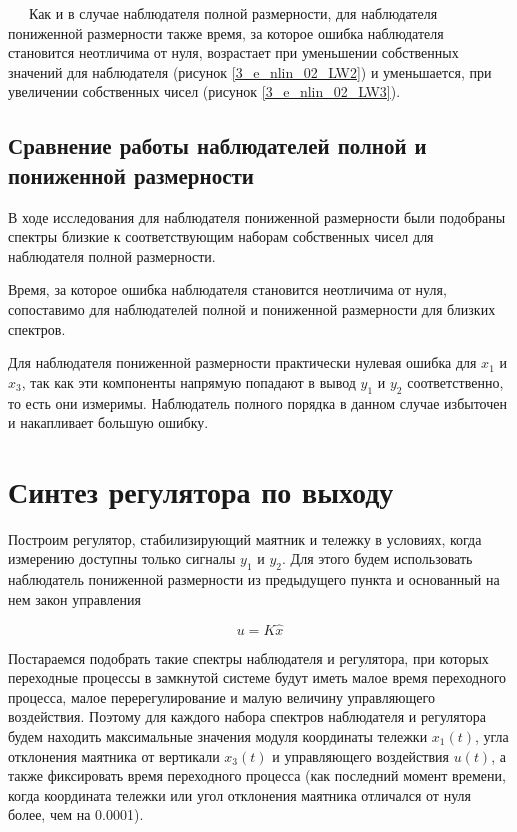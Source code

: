 \newpage
\,
\newpage
\,
\newpage
\,
\newpage
Как и в случае наблюдателя полной размерности, для наблюдателя пониженной размерности также время, за которое ошибка наблюдателя становится неотличима от нуля, возрастает при уменьшении собственных значений для наблюдателя (рисунок \ref{3_e_nlin_02_LW2}) и уменьшается, при увеличении собственных чисел (рисунок \ref{3_e_nlin_02_LW3}).

\subsection{Сравнение работы наблюдателей полной и пониженной размерности}

В ходе исследования для наблюдателя пониженной размерности были подобраны спектры близкие к соответствующим наборам собственных чисел для наблюдателя полной размерности. 

Время, за которое ошибка наблюдателя становится неотличима от нуля, сопоставимо для наблюдателей полной и пониженной размерности для близких спектров. 

Для наблюдателя пониженной размерности практически нулевая ошибка для $x_1$ и $x_3$, так как эти компоненты напрямую попадают в вывод $y_1$ и $y_2$ соответственно, то есть они измеримы. Наблюдатель полного порядка в данном случае избыточен и накапливает большую ошибку. 


\section{Синтез регулятора по выходу}
Построим регулятор, стабилизирующий маятник и тележку в условиях, когда измерению доступны только сигналы $y_1$ и $y_2$. Для этого будем использовать наблюдатель пониженной размерности из предыдущего пункта и основанный на нем закон управления

\begin{equation}
    u = K \hat{x}
\end{equation}

Постараемся подобрать такие спектры наблюдателя и регулятора, при которых переходные процессы в замкнутой системе будут иметь малое время переходного процесса, малое перерегулирование и малую величину управляющего воздействия. Поэтому для каждого набора спектров наблюдателя и регулятора будем находить  максимальные значения модуля координаты тележки $x_1(t)$, угла отклонения маятника от вертикали $x_3(t)$ и управляющего воздействия $u(t)$, а также фиксировать время переходного процесса (как последний момент времени, когда координата тележки или угол отклонения маятника отличался от нуля более, чем на 0.0001).

